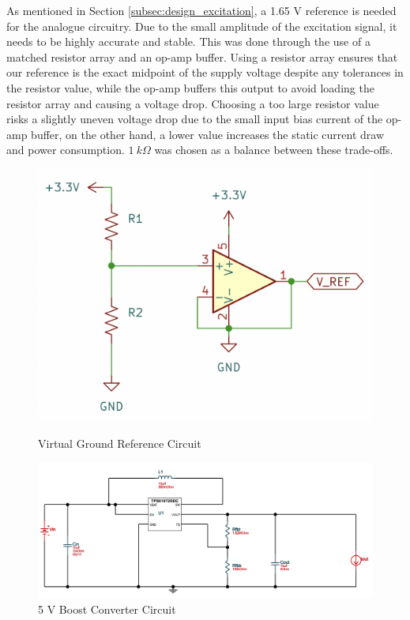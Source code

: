 As mentioned in Section \ref{subsec:design_excitation}, a 1.65 V reference is needed for the analogue circuitry. Due to the small amplitude of the excitation signal, it needs to be highly accurate and stable. This was done through the use of a matched resistor array and an op-amp buffer. Using a resistor array ensures that our reference is the exact midpoint of the supply voltage despite any tolerances in the resistor value, while the op-amp buffers this output to avoid loading the resistor array and causing a voltage drop. Choosing a too large resistor value risks a slightly uneven voltage drop due to the small input bias current of the op-amp buffer, on the other hand, a lower value increases the static current draw and power consumption. $1~k\Omega$ was chosen as a balance between these trade-offs.

\begin{figure}[H]
    \centering
    \begin{minipage}{0.35\textwidth}
        \centering
        \includegraphics[width=\textwidth]{Vground.png}
        \caption[Virtual Ground Reference Circuit]{\newline Virtual Ground Reference Circuit}
        \label{fig:virtual_ground}
    \end{minipage}\hfill
    \begin{minipage}{0.6\textwidth}
        \centering
        \includegraphics[width=\textwidth]{5V_Reg.png}
        \caption{5 V Boost Converter Circuit}
        \label{fig:5V_reg}
    \end{minipage}
\end{figure}

